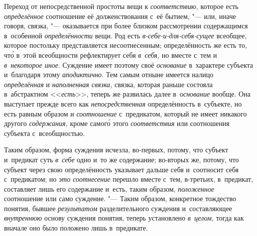 Переход от непосредственной простоты вещи к {\em соответствию,} которое есть
{\em определённое} соотношение её долженствования с~её бытием, "--- или, иначе
говоря, связка, "--- оказывается при более близком рассмотрении содержащимся
в~особенной {\em определённости} вещи. Род есть {\em в-себе-и-для-себя-сущее}
всеобщее, которое постольку представляется несоотнесенным; определённость же
есть то, чт\'{о} в~этой всеобщности рефлектирует себя {\em в~себя,} но вместе с~тем
и {\em в~некоторое иное}. Суждение имеет поэтому своё {\em основание}
в~характере субъекта и~благодаря этому {\em аподиктично}. Тем самым отныне
имеется налицо {\em определённая} и {\em наполненная связка,} связка, которая
раньше состояла в~абстрактном <<{\em есть}>>, теперь же развилась далее
в~{\em основание} вообще. Она выступает прежде всего как {\em непосредственная}
определённость в~субъекте, но есть равным образом и {\em соотношение}
с~предикатом, который не имеет никакого другого {\em содержания,} кроме
самог\'{о} этого {\em соответствия} или соотношения субъекта с~всеобщностью.

Таким образом, форма суждения исчезла, во-первых, потому, что
субъект и~предикат суть {\em в~себе}
одно и~то же содержание; во-вторых же, потому, что субъект
через свою определённость указывает дальше себя и~соотносит себя
с~предикатом; но {\em это соотнесение} перешло вместе с~тем, в-третьих,
в~предикат, составляет лишь его содержание и~есть, таким образом,
{\em положенное} соотношение или само суждение. "--- Таким образом,
конкретное тождество понятия, бывшее {\em результатом} разделительного суждения
и~составляющее {\em внутреннюю} основу суждения понятия, теперь установлено
{\em в~целом,} тогда как вначале оно было положено лишь в~предикате.

